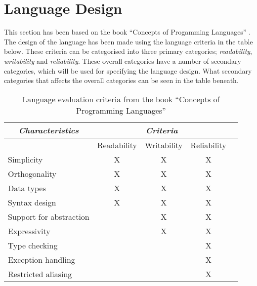\chapter{Language Design}

This section has been based on the book ``Concepts of Progamming Languages'' \cite{CoPL}. The design of the language has been made using the language criteria in the table below. These criteria can be categorised into three primary categories; \textit{readability}, \textit{writability} and \textit{reliability}. These overall categories have a number of secondary categories, which will be used for specifying the language design. What secondary categories that affects the overall categories can be seen in the table beneath.

\begin{table}[htbp]
\centering
\begin{tabular}{|l|c|c|c|c|}
\hline
\multicolumn{1}{|c|}{\textit{Characteristics}} & \multicolumn{3}{|c|}{\textit{Criteria}} \\ \hline
 & Readability & Writability & Reliability \\ \hline
Simplicity & X & X & X \\ \hline
Orthogonality & X & X & X \\ \hline
Data types & X & X & X \\ \hline
Syntax design & X & X & X  \\ \hline
Support for abstraction & & X & X  \\ \hline
Expressivity & & X & X \\ \hline
Type checking & & & X \\ \hline
Exception handling & & & X \\ \hline
Restricted aliasing & & & X \\ \hline
\end{tabular}
\caption{Language evaluation criteria from the book ``Concepts of Programming Languages''\cite{CoPL}}
\label{tbl:evaluation criteria}
\end{table}

